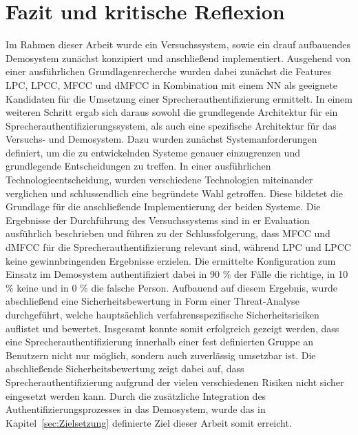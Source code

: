 \section{Fazit und kritische Reflexion}
Im Rahmen dieser Arbeit wurde ein Versuchssystem, sowie ein drauf aufbauendes Demosystem zunächst konzipiert und anschließend implementiert.
Ausgehend von einer ausführlichen Grundlagenrecherche wurden dabei zunächst die Features \ac{LPC}, \ac{LPCC}, \ac{MFCC} und \ac{dMFCC} in Kombination mit einem \ac{NN} als geeignete Kandidaten für die Umsetzung einer Sprecherauthentifizierung ermittelt.
In einem weiteren Schritt ergab sich daraus sowohl die grundlegende Architektur für ein Sprecherauthentifizierungssystem, als auch eine spezifische Architektur für das Versuchs- und Demosystem.
Dazu wurden zunächst Systemanforderungen definiert, um die zu entwickelnden Systeme genauer einzugrenzen und grundlegende Entscheidungen zu treffen.
In einer ausführlichen Technologieentscheidung, wurden verschiedene Technologien miteinander verglichen und schlussendlich eine begründete Wahl getroffen.
Diese bildetet die Grundlage für die anschließende Implementierung der beiden Systeme.
Die Ergebnisse der Durchführung des Versuchssystems sind in er Evaluation ausführlich beschrieben und führen zu der Schlussfolgerung, dass \ac{MFCC} und \ac{dMFCC} für die Sprecherauthentifizierung relevant sind, während \ac{LPC} und \ac{LPCC} keine gewinnbringenden Ergebnisse erzielen.
Die ermittelte Konfiguration zum Einsatz im Demosystem authentifiziert dabei in 90 \% der Fälle die richtige, in 10 \% keine und in 0 \% die falsche Person.
Aufbauend auf diesem Ergebnis, wurde abschließend eine Sicherheitsbewertung in Form einer Threat-Analyse durchgeführt, welche hauptsächlich verfahrensspezifische Sicherheitsrisiken auflistet und bewertet.
Insgesamt konnte somit erfolgreich gezeigt werden, dass eine Sprecherauthentifizierung innerhalb einer fest definierten Gruppe an Benutzern nicht nur möglich, sondern auch zuverlässig umsetzbar ist.
Die abschließende Sicherheitsbewertung zeigt dabei auf, dass Sprecherauthentifizierung aufgrund der vielen verschiedenen Risiken nicht sicher eingesetzt werden kann.
Durch die zusätzliche Integration des Authentifizierungsprozesses in das Demosystem, wurde das in Kapitel~\ref{sec:Zielsetzung} definierte Ziel dieser Arbeit somit erreicht.